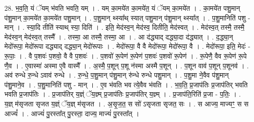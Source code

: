 \documentclass[17pt]{extarticle}
\begin{document}
28. भ॒व॒ति॒ यं ॅयम् भ॑वति भवति॒ यम् । . यम् का॒मये॑त का॒मये॑त॒ यं ॅयम् का॒मये॑त । . का॒मये॑त पशु॒मान् प॑शु॒मान् का॒मये॑त का॒मये॑त पशु॒मान् । . प॒शु॒मान् थ्स्या᳚थ् स्यात् पशु॒मान् प॑शु॒मान् थ्स्या᳚त् । . प॒शु॒मानिति॑ पशु - मान् । . स्या॒दि तीति॑ स्याथ् स्या॒ दिति॑ । . इति॒ मेद॑स्व॒न् मेद॑स्व॒ दितीति॒ मेद॑स्वत् । . मेद॑स्व॒त् तस्मै॒ तस्मै॒ मेद॑स्व॒न् मेद॑स्व॒त् तस्मै᳚ । . तस्मा॒ आ तस्मै॒ तस्मा॒ आ । . आ द॑द्ध्याद् दद्ध्या॒दा द॑द्ध्यात् । . द॒द्ध्या॒न् मेदो॑रूपा॒ मेदो॑रूपा दद्ध्याद् दद्ध्या॒न् मेदो॑रूपाः । . मेदो॑रूपा॒ वै वै मेदो॑रूपा॒ मेदो॑रूपा॒ वै । . मेदो॑रूपा॒ इति॒ मेदः॑ - रू॒पाः॒ । . वै प॒शवः॑ प॒शवो॒ वै वै प॒शवः॑ । . प॒शवो॑ रू॒पेण॑ रू॒पेण॑ प॒शवः॑ प॒शवो॑ रू॒पेण॑ । . रू॒पेणै॒ वैव रू॒पेण॑ रू॒पे णै॒व । . ए॒वास्मा॑ अस्मा ए॒वै वास्मै᳚ । . अ॒स्मै॒ प॒शून् प॒शू न॑स्मा अस्मै प॒शून् । . प॒शून वाव॑ प॒शून् प॒शूनव॑ । . अव॑ रुन्धे रु॒न्धे ऽवाव॑ रुन्धे । . रु॒न्धे॒ प॒शु॒मान् प॑शु॒मान् रु॑न्धे रुन्धे पशु॒मान् । . प॒शु॒मा ने॒वैव प॑शु॒मान् प॑शु॒माने॒व । . प॒शु॒मानिति॑ पशु - मान् । . ए॒व भ॑वति भव त्ये॒वैव भ॑वति । . भ॒व॒ति॒ प्र॒जाप॑तिः प्र॒जाप॑तिर् भवति भवति प्र॒जाप॑तिः । . प्र॒जाप॑तिर् य॒ज्ञ्ं ॅय॒ज्ञ्म् प्र॒जाप॑तिः प्र॒जाप॑तिर् य॒ज्ञ्म् । . प्र॒जाप॑ति॒रिति॑ प्र॒जा - प॒तिः॒ । . य॒ज्ञ् म॑सृजता सृजत य॒ज्ञ्ं ॅय॒ज्ञ् म॑सृजत । . अ॒सृ॒ज॒त॒ स सो॑ ऽसृजता सृजत॒ सः । . स आज्य॒ माज्यꣳ॒॒ स स आज्यं᳚ । . आज्यं॑ पु॒रस्ता᳚त् पु॒रस्ता॒ दाज्य॒ माज्यं॑ पु॒रस्ता᳚त् । \newline
\end{document}
